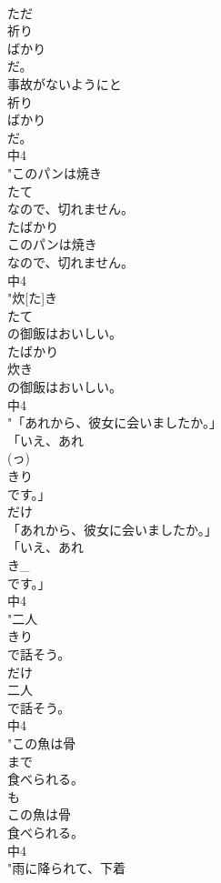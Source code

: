\documentclass[8pt]{extreport}
\begin{document}
\begin{CJK}{UTF8}{min}
\\	ただ
\\	祈り
\\	ばかり
\\	だ。
\\	事故がないようにと
\\	祈り
\\	ばかり
\\	だ。
\\	中4
\\	"このパンは焼き
\\	たて
\\	なので、切れません。
\\	たばかり	
\\	このパンは焼き
\\	なので、切れません。
\\	中4
\\	"炊[た]き
\\	たて
\\	の御飯はおいしい。
\\	たばかり	
\\	炊き
\\	の御飯はおいしい。
\\	中4
\\	"「あれから、彼女に会いましたか。」
\\	「いえ、あれ
\\	(っ)
\\	きり
\\	です。」
\\	だけ	
\\	「あれから、彼女に会いましたか。」
\\	「いえ、あれ
\\	き_
\\	です。」
\\	中4
\\	"二人
\\	きり
\\	で話そう。
\\	だけ	
\\	二人
\\	で話そう。
\\	中4
\\	"この魚は骨
\\	まで
\\	食べられる。
\\	も 
\\	この魚は骨
\\	食べられる。
\\	中4
\\	"雨に降られて、下着

\end{CJK}
\end{document}
